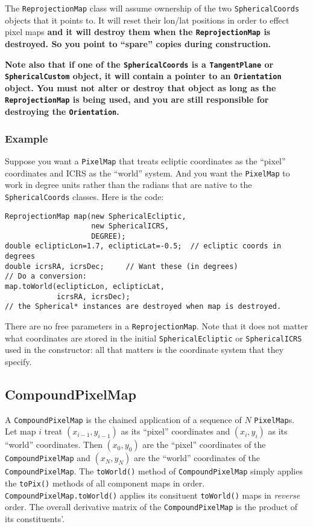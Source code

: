 \documentclass[11pt,preprint,flushrt]{aastex}
\begin{document}
The {\tt ReprojectionMap} class will assume ownership of the two {\tt SphericalCoords} objects that it points to.  It will reset their lon/lat positions in order to effect pixel maps {\bf and it will destroy them when the {\tt ReprojectionMap} is destroyed.  So you point to ``spare'' copies during construction.}

{\bf Note also that if one of the {\tt SphericalCoords} is a {\tt TangentPlane} or {\tt SphericalCustom} object, it will contain a pointer to an {\tt Orientation} object.  You must not alter or destroy that object as long as the {\tt ReprojectionMap} is being used, and you are still responsible for destroying the {\tt Orientation}.}

\subsubsection{Example}
Suppose you want a {\tt PixelMap} that treats ecliptic coordinates as the ``pixel'' coordinates and ICRS as the ``world'' system.  And you want the {\tt PixelMap} to work in degree units rather than the radians that are native to the {\tt SphericalCoords} classes.  Here is the code:
\begin{verbatim}
ReprojectionMap map(new SphericalEcliptic,
                    new SphericalICRS,
                    DEGREE);
double eclipticLon=1.7, eclipticLat=-0.5;  // ecliptic coords in degrees
double icrsRA, icrsDec;     // Want these (in degrees)
// Do a conversion:
map.toWorld(eclipticLon, eclipticLat,
            icrsRA, icrsDec);
// the Spherical* instances are destroyed when map is destroyed.
\end{verbatim}
There are no free parameters in a {\tt ReprojectionMap}.  Note that it does not matter what coordinates are stored in the initial {\tt SphericalEcliptic} or {\tt SphericalICRS} used in the constructor: all that matters is the coordinate system that they specify.

\subsection{CompoundPixelMap}
A {\tt CompoundPixelMap} is the chained application of a sequence of $N$ {\tt PixelMap}s.  Let map $i$ treat $(x_{i-1},y_{i-1})$ as its ``pixel'' coordinates and $(x_i,y_i)$ as its ``world'' coordinates.  Then $(x_0,y_0)$ are the ``pixel'' coordinates of the {\tt CompoundPixelMap} and $(x_N,y_N)$ are the ``world'' coordinates of the {\tt CompoundPixelMap}.  The {\tt toWorld()} method of {\tt CompoundPixelMap} simply applies the {\tt toPix()} methods of all component maps in order.  {\tt CompoundPixelMap.toWorld()} applies its consituent {\tt toWorld()} maps in {\em reverse} order.  The overall derivative matrix of the {\tt CompoundPixelMap} is the product of its constituents'.
\end{document}
